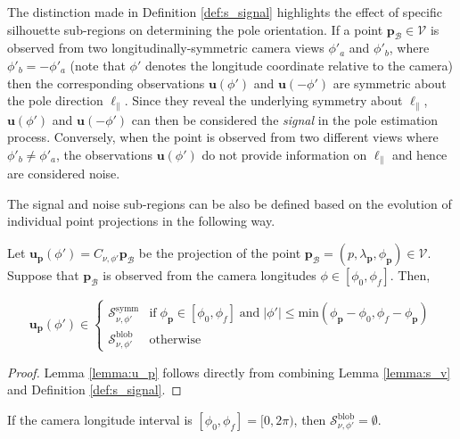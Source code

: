 The distinction made in Definition \ref{def:s_signal} highlights the effect of specific silhouette sub-regions on determining the pole orientation. If a point $\mathbf{p}_\mathcal{B}\in\mathcal{V}$ is observed from two longitudinally-symmetric camera views $\phi'_a$ and $\phi'_b$, where $\phi'_b = -\phi'_a$ (note that $\phi'$ denotes the longitude coordinate relative to the camera) then the corresponding observations $\mathbf{u}(\phi')$ and $\mathbf{u}(-\phi')$ are symmetric about the pole direction $\boldsymbol{\ell}_\parallel$. Since they reveal the underlying symmetry about $\boldsymbol{\ell}_\parallel$, $\mathbf{u}(\phi')$ and $\mathbf{u}(-\phi')$ can then be considered the \textit{signal} in the pole estimation process. Conversely, when the point is observed from two different views where $\phi'_b \neq \phi'_a$, the observations $\mathbf{u}(\phi')$ do not provide information on $\ell_\parallel$ and hence are considered noise.

The signal and noise sub-regions can be also be defined based on the evolution of individual point projections in the following way.

\begin{lemma}
\label{lemma:u_p}
Let $\mathbf{u}_\mathbf{p}(\phi')=C_{\nu,\phi'}\mathbf{p}_\mathcal{B}$ be the projection of the point $\mathbf{p}_\mathcal{B}=(p,\lambda_\mathbf{p},\phi_\mathbf{p})\in\mathcal{V}$. Suppose that $\mathbf{p}_\mathcal{B}$ is observed from the camera longitudes $\phi\in [\phi_0,\phi_f]$. Then,

\begin{equation}
    \mathbf{u}_\mathbf{p}(\phi') \in
    \begin{cases}
        \mathcal{S}^\mathrm{symm}_{\nu,\phi'} & \text{if} \; \phi_\mathbf{p} \in [\phi_0,\phi_f] \; \text{and} \; |\phi'| \leq \mathrm{min}(\phi_\mathbf{p}-\phi_0,\phi_f - \phi_\mathbf{p})\\
        \mathcal{S}^\mathrm{blob}_{\nu,\phi'} & \text{otherwise}
    \end{cases}
\end{equation}
\end{lemma}

\begin{proof}
    Lemma \ref{lemma:u_p} follows directly from combining Lemma \ref{lemma:s_v} and Definition \ref{def:s_signal}. 
\end{proof}

\begin{corollary}
    \label{cor:s_noise}
    If the camera longitude interval is $[\phi_0,\phi_f]=[0,2\pi)$, then $\mathcal{S}^\mathrm{blob}_{\nu,\phi'} = \emptyset$.
\end{corollary}

